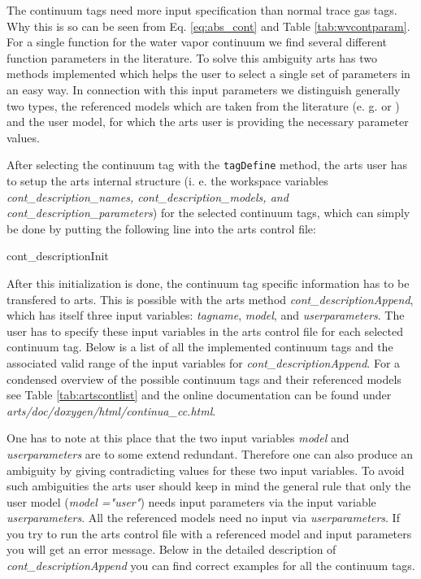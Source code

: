 The continuum tags need more input specification than normal trace gas
tags. Why this is so can be seen from Eq. \ref{eq:abs_cont} and 
Table \ref{tab:wvcontparam}. For a single function for the water vapor 
continuum we find several different function parameters in the literature. 
To solve this ambiguity arts has two methods implemented which helps 
the user to select a single set of parameters in an easy way. 
In connection with this input parameters we distinguish generally two 
types, the referenced models which are taken from the literature 
(e. g. \citet{liebeetal:93} or \citet{pwr:93}) and the user model, 
for which the arts user is providing the necessary parameter values.

After selecting the continuum tag with the {\tt tagDefine} method, 
the arts user has to setup the arts internal structure (i. e. the workspace 
variables {\it cont\_description\_names, cont\_description\_models, 
and cont\_description\_parameters}) for the selected continuum tags, 
which can simply be done by putting the following line into the 
arts control file:
\begin{code}
cont_descriptionInit{}
\end{code}

After this initialization is done, the continuum tag specific
information has to be transfered to arts. This is possible with the 
arts method {\it cont\_descriptionAppend}, which has itself 
three input variables: {\it tagname}, {\it model}, and 
{\it userparameters}. The user has to specify these input 
variables in the arts control file for each selected continuum tag. 
Below is a list of all the implemented continuum tags and the associated
valid range of the input variables for {\it cont\_descriptionAppend}. 
For a condensed overview of the possible continuum tags and their 
referenced models see Table \ref{tab:artscontlist} and the 
online documentation can be found under {\it arts/doc/doxygen/html/continua\_cc.html}.

One has to note at this place that the two input variables {\it model} and
{\it userparameters} are to some extend redundant. Therefore one can also 
produce an ambiguity by giving contradicting values for these two input variables.
To avoid such ambiguities the arts user should keep in mind the general 
rule that only the user model ({\it model ="user"}) needs input parameters 
via the input variable {\it userparameters}. All the referenced models 
need no input via {\it userparameters}. If you try to run the arts control 
file with a referenced model and input parameters you will get an error message.
Below in the detailed description of {\it cont\_descriptionAppend} you 
can find correct examples for all the continuum tags.
 
